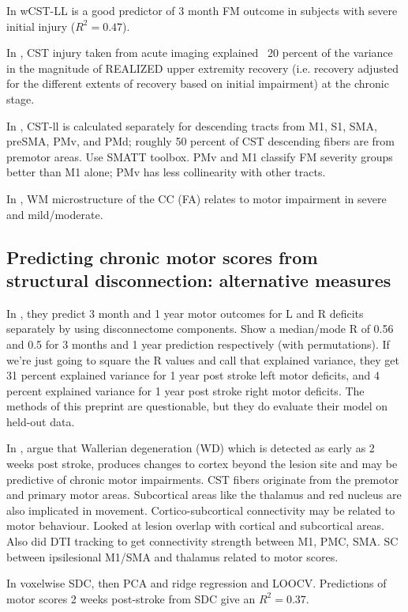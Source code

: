 \documentclass[10pt]{article}
\begin{document}
In \cite{Feng2015-du} wCST-LL is a good predictor of 3 month FM outcome in subjects with severe initial injury ($R^2 = 0.47$).

In \cite{Lin2019-hy}, CST injury taken from acute imaging explained ~20 percent of the variance in the magnitude of REALIZED upper extremity recovery (i.e. recovery adjusted for the different extents of recovery based on initial impairment) at the chronic stage.

In \cite{Ito2022-em}, CST-ll is calculated separately for descending tracts from M1, S1, SMA, preSMA, PMv, and PMd; roughly 50 percent of CST descending fibers are from premotor areas. Use SMATT toolbox. PMv and M1 classify FM severity groups better than M1 alone; PMv has less collinearity with other tracts.

In \cite{Hayward2022-hv}, WM microstructure of the CC (FA) relates to motor impairment in severe and mild/moderate. 

\subsection*{Predicting chronic motor scores from structural disconnection: alternative measures}
In \cite{Dulyan2021-jf}, they predict 3 month and 1 year motor outcomes for L and R deficits separately by using disconnectome components. Show a median/mode R of 0.56 and 0.5 for 3 months and 1 year prediction respectively (with permutations). If we're just going to square the R values and call that explained variance, they get 31 percent explained variance for 1 year post stroke left motor deficits, and 4 percent explained variance for 1 year post stroke right motor deficits. The methods of this preprint are questionable, but they do evaluate their model on held-out data.

In \cite{Peters2018-tf}, argue that Wallerian degeneration (WD) which is detected as early as 2 weeks post stroke, produces changes to cortex beyond the lesion site and may be predictive of chronic motor impairments. CST fibers originate from the premotor and primary motor areas. Subcortical areas like the thalamus and red nucleus are also implicated in movement. Cortico-subcortical connectivity may be related to motor behaviour. Looked at lesion overlap with cortical and subcortical areas. Also did DTI tracking to get connectivity strength between M1, PMC, SMA. SC between ipsilesional M1/SMA and thalamus related to motor scores.  

In \cite{Salvalaggio2020-pe} voxelwise SDC, then PCA and ridge regression and LOOCV. Predictions of motor scores 2 weeks post-stroke from SDC give an $R^2 = 0.37$.
\end{document}
